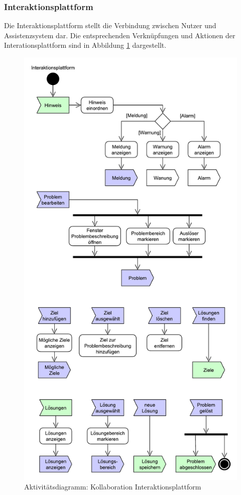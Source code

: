 \subsubsection*{Interaktionsplattform}
Die Interaktionsplattform stellt die Verbindung zwischen Nutzer und Assistenzsystem dar. Die entsprechenden Verknüpfungen und Aktionen der Interationsplattform sind in Abbildung \ref{pic:Kollaboration-Interaktionsplattform} dargestellt.

\begin{figure}[htbp]
\centering
\includegraphics[scale=0.5]{DA_files/UML/Konzept/Aktivitaetsdiagramm-Interaktionsplattform.pdf}
\caption{Aktivitätsdiagramm: Kollaboration Interaktionsplattform}
\label{pic:Kollaboration-Interaktionsplattform}
\end{figure}


